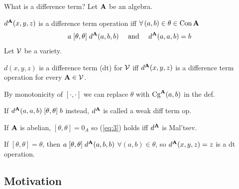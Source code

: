 \documentclass[notes=hide,12pt,xcolor=dvipsnames%
   ]{beamer}
\renewcommand{\defn}[1]{\alert{#1}}
\theoremstyle{definition}
\begin{document}


\begin{frame}[shrink=2,label=diff]{What is a difference term?}
  Let $\mathbf{A}$ be an algebra.

  $d^{\mathbf{A}}(x,y,z)$ is a \alert{difference term operation} iff 
  $\forall\, (a,b) \in \theta \in \operatorname{Con} \mathbf{A}$
  \begin{equation}
    \label{eq:3}  
    a \mathrel{[\theta, \theta]} d^{\mathbf{A}}(a,b,b) 
    \quad \text{ and } \quad
    d^{\mathbf{A}}(a,a,b) = b 
  \end{equation}
  \pause
  Let $\mathcal{V}$ be a variety. %

  $d(x,y,z)$ is a \alert{difference term} (dt) for $\mathcal{V}$ iff
  $d^{\mathbf{A}}(x,y,z)$ is a difference term operation for every $\mathbf{A} \in \mathcal{V}$.

  \pause
  By monotonicity of $[\cdot, \cdot]$ we can replace $\theta$ 
  with $\operatorname{Cg}^{\mathbf{A}}(a,b)$ in the def.

  \pause 
  If $d^{\mathbf{A}}(a,a,b) \mathrel{[\theta, \theta]} b$ instead, $d^{\mathbf{A}}$ is called a \alert{weak diff term op}.

  \pause
  If $\mathbf{A}$ is \alert{abelian},
  $[\theta, \theta] = 0_A$ so
  (\ref{eq:3}) holds iff $d^{\mathbf{A}}$ is Mal'tsev.

  \pause
  If $[\theta, \theta] = \theta$,  then
  $a \mathrel{[\theta, \theta]} d^{\mathbf{A}}(a,b,b)$ $\forall (a, b) \in \theta$, so
  $d^{\mathbf{A}}(x,y,z) = z$ is a dt operation.
\end{frame}



\subsection{Motivation}
\end{document}

